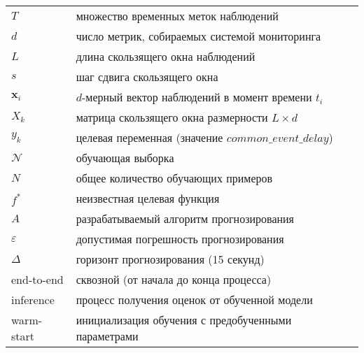 \begin{tabular}{p{} p{}}
$T$ & множество временных меток наблюдений \\
$d$ & число метрик, собираемых системой мониторинга \\
$L$ & длина скользящего окна наблюдений \\
$s$ & шаг сдвига скользящего окна \\
$\mathbf{x}_i$ & $d$-мерный вектор наблюдений в момент времени $t_i$ \\
$X_k$ & матрица скользящего окна размерности $L \times d$ \\
$y_k$ & целевая переменная (значение $common\_event\_delay$) \\
$\mathcal{N}$ & обучающая выборка \\
$N$ & общее количество обучающих примеров \\
$f^*$ & неизвестная целевая функция \\
$A$ & разрабатываемый алгоритм прогнозирования \\
$\varepsilon$ & допустимая погрешность прогнозирования \\
$\Delta$ & горизонт прогнозирования (15 секунд) \\
end-to-end & сквозной (от начала до конца процесса) \\
inference & процесс получения оценок от обученной модели \\
warm-start & инициализация обучения с предобученными параметрами \\
\end{tabular}

\newpage 
